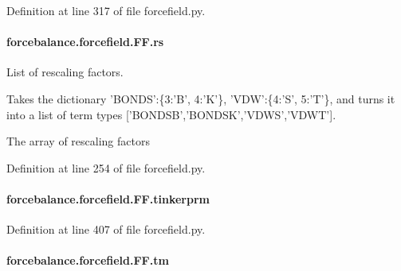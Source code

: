 Definition at line 317 of file forcefield.\-py.

\hypertarget{classforcebalance_1_1forcefield_1_1FF_acf33c8285b56b92510b5572448c3358e}{
\paragraph[{rs}]{\setlength{\rightskip}{0pt plus 5cm}forcebalance.\-forcefield.\-F\-F.\-rs}}\label{classforcebalance_1_1forcefield_1_1FF_acf33c8285b56b92510b5572448c3358e}


List of rescaling factors. 

Takes the dictionary 'B\-O\-N\-D\-S'\-:\{3\-:'B', 4\-:'K'\}, 'V\-D\-W'\-:\{4\-:'S', 5\-:'T'\}, and turns it into a list of term types \mbox{[}'B\-O\-N\-D\-S\-B','B\-O\-N\-D\-S\-K','V\-D\-W\-S','V\-D\-W\-T'\mbox{]}.

The array of rescaling factors 

Definition at line 254 of file forcefield.\-py.

\hypertarget{classforcebalance_1_1forcefield_1_1FF_a62aa95ac960282ccae808ba05e3ecda1}{
\paragraph[{tinkerprm}]{\setlength{\rightskip}{0pt plus 5cm}forcebalance.\-forcefield.\-F\-F.\-tinkerprm}}\label{classforcebalance_1_1forcefield_1_1FF_a62aa95ac960282ccae808ba05e3ecda1}


Definition at line 407 of file forcefield.\-py.

\hypertarget{classforcebalance_1_1forcefield_1_1FF_aaf4763b05f3c1f7762d5c4d656ad106a}{
\paragraph[{tm}]{\setlength{\rightskip}{0pt plus 5cm}forcebalance.\-forcefield.\-F\-F.\-tm}}\label{classforcebalance_1_1forcefield_1_1FF_aaf4763b05f3c1f7762d5c4d656ad106a}


